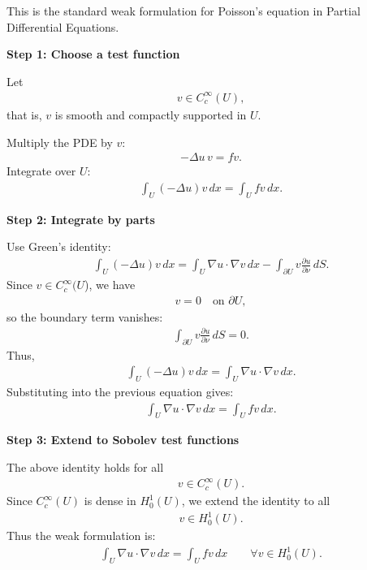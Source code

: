 \documentclass[12pt,a4paper]{report}
\begin{document}
\begin{description}
This is the standard weak formulation for Poisson’s equation in Partial Differential Equations.

\begin{description}

\item \textbf{Step 1: Choose a test function}

Let
\begin{align*}
v\in C_c^\infty(U),
\end{align*}
that is, $v$ is smooth and compactly supported in $U$.

Multiply the PDE by $v$:
\begin{align*}
-\Delta u\, v=fv.
\end{align*}
Integrate over $U$:
\begin{align*}
\int_U (-\Delta u)v\,dx=\int_U fv\,dx.
\end{align*}

\item \textbf{Step 2: Integrate by parts}

Use Green’s identity:
\begin{align*}
\int_U (-\Delta u)v\,dx =  \int_U \nabla u\cdot\nabla v\,dx - \int_{\partial U}v\frac{\partial u}{\partial\nu}\,dS.
\end{align*}
Since $v\in C_c^\infty(U$), we have
\begin{align*}
v=0 \quad\text{on }\partial U,
\end{align*}
so the boundary term vanishes:
\begin{align*}
\int_{\partial U}v\frac{\partial u}{\partial\nu}\,dS=0.
\end{align*}
Thus,
\begin{align*}
\int_U (-\Delta u)v\,dx = \int_U \nabla u\cdot\nabla v\,dx.
\end{align*}
Substituting into the previous equation gives:
\begin{align*}
\int_U \nabla u\cdot\nabla v\,dx = \int_U fv\,dx.
\end{align*}

\item \textbf{Step 3: Extend to Sobolev test functions}

The above identity holds for all
\begin{align*}
v\in C_c^\infty(U).
\end{align*}
Since $C_c^\infty(U)$ is dense in $H_0^1(U)$, we extend the identity to all
\begin{align*}
v\in H_0^1(U).
\end{align*}
Thus the weak formulation is:
\begin{align*}
\boxed{
\int_U \nabla u\cdot\nabla v\,dx = \int_U fv\,dx \qquad\forall v\in H_0^1(U).
}
\end{align*}


\end{description}
\end{description}
\end{document}
